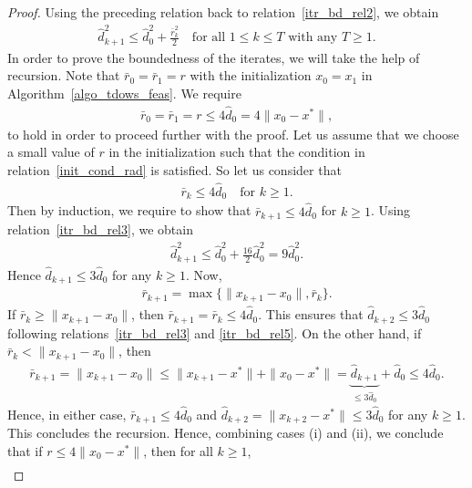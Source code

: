 \documentclass{article}
\theoremstyle{plain}
\theoremstyle{definition}
\theoremstyle{remark}
\begin{document}
\begin{proof}
    Using the preceding relation back to relation~\eqref{itr_bd_rel2}, we obtain
    \begin{align}
        \hat d_{k+1}^2 \leq \hat d_0^2 + \frac{\bar{r}_k^2}{2} \quad \text{for all $1 \leq k \leq T$ with any $T \geq 1$} . \label{itr_bd_rel3}
    \end{align}
    In order to prove the boundedness of the iterates, we will take the help of recursion. Note that $\bar r_0 = \bar r_1 = r$ with the initialization $x_0 = x_1$ in Algorithm~\ref{algo_tdows_feas}. We require
    \begin{align}
        \bar r_0 = \bar r_1 = r \leq 4 \hat d_0 = 4 \|x_0 - x^*\| , \label{init_cond_rad}
    \end{align}
    to hold in order to proceed further with the proof. Let us assume that we choose a small value of $r$ in the initialization such that the condition in relation~\eqref{init_cond_rad} is satisfied. So let us consider that \begin{align}
        \bar r_k \leq 4 \hat d_0 \quad \text{for $k \geq 1$} . \label{itr_bd_rel4}
    \end{align}
    Then by induction, we require to show that $\bar r_{k+1} \leq 4 \hat d_0$ for $k \geq 1$. Using relation~\eqref{itr_bd_rel3}, we obtain
    \begin{align}
        \hat d_{k+1}^2 \leq \hat d_0^2 + \frac{16}{2} \hat d_0^2 = 9 \hat d_0^2 . \label{itr_bd_rel5}
    \end{align}
    Hence $\hat d_{k+1} \leq 3 \hat d_0$ for any $k \geq 1$. Now,
    \begin{align*}
        \bar r_{k+1} = \max\{\|x_{k+1}-x_0\|, \bar r_k\}.
    \end{align*}
    If $\bar r_k \geq \|x_{k+1}-x_0\|$, then $\bar r_{k+1} = \bar r_k \leq 4 \hat d_0$. This ensures that $\hat d_{k+2} \leq 3 \hat d_0$ following relations~\eqref{itr_bd_rel3} and \eqref{itr_bd_rel5}. On the other hand, if $\bar r_k < \|x_{k+1}-x_0\|$, then
    \begin{align*}
        \bar r_{k+1} = \|x_{k+1}-x_0\| \leq \|x_{k+1} - x^*\| + \|x_0-x^*\| = \underbrace{\hat d_{k+1}}_{\leq 3 \hat d_0} + \hat d_0 \leq 4 \hat d_0.
    \end{align*}
    Hence, in either case, $\bar r_{k+1} \leq 4 \hat d_0$ and $\hat d_{k+2} = \|x_{k+2} - x^*\| \leq 3 \hat d_0$ for any $k \geq 1$. This concludes the recursion. Hence, combining cases (i) and (ii), we conclude that if $r \leq 4 \|x_0 - x^*\|$, then for all $k \geq 1$, 
    \begin{align}

\end{align}
\end{proof}
\end{document}
